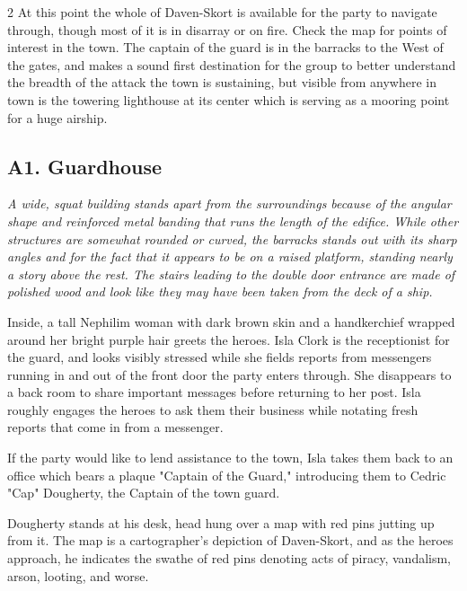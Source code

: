 \begin{multicols}{2}
At this point the whole of Daven-Skort is available for the party to navigate through, though most of it is in disarray or on fire. Check the map for points of interest in the town. The captain of the guard is in the barracks to the West of the gates, and makes a sound first destination for the group to better understand the breadth of the attack the town is sustaining, but visible from anywhere in town is the towering lighthouse at its center which is serving as a mooring point for a huge airship.

  \subsection{A1. Guardhouse}

  \begin{pf-parchment}[\textcolor{title1}{Description}]
    \textcolor{title1}{\textit{A wide, squat building stands apart from the surroundings because of the angular shape and reinforced metal banding that runs the length of the edifice. While other structures are somewhat rounded or curved, the barracks stands out with its sharp angles and for the fact that it appears to be on a raised platform, standing nearly a story above the rest. The stairs leading to the double door entrance are made of polished wood and look like they may have been taken from the deck of a ship.}}
  \end{pf-parchment}

Inside, a tall Nephilim woman with dark brown skin and a handkerchief wrapped around her bright purple hair greets the heroes. Isla Clork is the receptionist for the guard, and looks visibly stressed while she fields reports from messengers running in and out of the front door the party enters through. She disappears to a back room to share important messages before returning to her post. Isla roughly engages the heroes to ask them their business while notating fresh reports that come in from a messenger. 

If the party would like to lend assistance to the town, Isla takes them back to an office which bears a plaque "Captain of the Guard," introducing them to Cedric "Cap" Dougherty, the Captain of the town guard. 

Dougherty stands at his desk, head hung over a map with red pins jutting up from it. The map is a cartographer's depiction of Daven-Skort, and as the heroes approach, he indicates the swathe of red pins denoting acts of piracy, vandalism, arson, looting, and worse.


\end{multicols}
